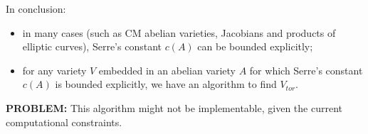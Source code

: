 \documentclass[12pt]{beamer}
\begin{document}

\begin{frame}
In conclusion: 
\begin{itemize}
	\item in many cases (such as CM abelian varieties, Jacobians and products of elliptic curves), Serre's constant $c(A)$ can be bounded explicitly; \pause
	\item for any variety $V$ embedded in  an abelian variety $A$ for which Serre's constant $c(A)$ is bounded explicitly, we have an algorithm to find $V_{tor}$. \pause
\end{itemize}

\vspace{0.5cm}
\textbf{PROBLEM:} \qquad This algorithm might not be implementable, given the current computational constraints.

\end{frame}
\end{document}

